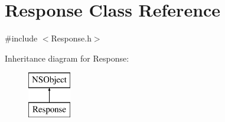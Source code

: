 \hypertarget{interface_response}{
\section{\-Response \-Class \-Reference}
\label{interface_response}
}


{\ttfamily \#include $<$\-Response.\-h$>$}

\-Inheritance diagram for \-Response\-:\begin{figure}[H]
\begin{center}
\leavevmode
\includegraphics[height=2.000000cm]{interface_response}
\end{center}
\end{figure}
